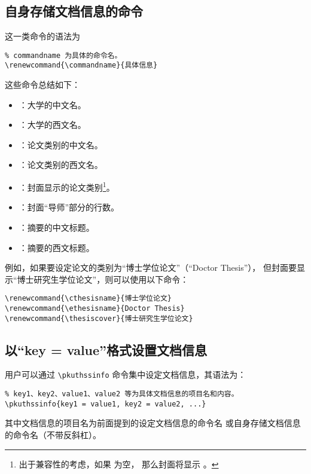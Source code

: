\subsection{自身存储文档信息的命令}

这一类命令的语法为
\begin{Verbatim}
% commandname 为具体的命令名。
\renewcommand{\commandname}{具体信息}
\end{Verbatim}

这些命令总结如下：
\begin{itemize}
  \item \texttt{\bfseries\string\cuniversity}：大学的中文名。
  \item \texttt{\bfseries\string\euniversity}：大学的西文名。
  \item \texttt{\bfseries\string\cthesisname}：论文类别的中文名。
  \item \texttt{\bfseries\string\ethesisname}：论文类别的西文名。
  \item \texttt{\bfseries\string\thesiscover}：封面显示的论文类别\footnote{%
    出于兼容性的考虑，如果 \texttt{\string\thesiscover} 为空，
    那么封面将显示 \texttt{\string\cthesisname}。%
  }。
  \item \texttt{\bfseries\string\mentorlines}：封面“导师”部分的行数。
  \item \texttt{\bfseries\string\cabstractname}：摘要的中文标题。
  \item \texttt{\bfseries\string\eabstractname}：摘要的西文标题。
\end{itemize}

例如，如果要设定论文的类别为“博士学位论文”（“Doctor Thesis”），
但封面要显示“博士研究生学位论文”，则可以使用以下命令：
\begin{Verbatim}
\renewcommand{\cthesisname}{博士学位论文}
\renewcommand{\ethesisname}{Doctor Thesis}
\renewcommand{\thesiscover}{博士研究生学位论文}
\end{Verbatim}

\subsection{以“key = value”格式设置文档信息}

用户可以通过 \verb|\pkuthssinfo| 命令集中设定文档信息，其语法为：
\begin{Verbatim}
% key1、key2、value1、value2 等为具体文档信息的项目名和内容。
\pkuthssinfo{key1 = value1, key2 = value2, ...}
\end{Verbatim}
其中文档信息的项目名为前面提到的设定文档信息的命令名
或自身存储文档信息的命令名（不带反斜杠）。

